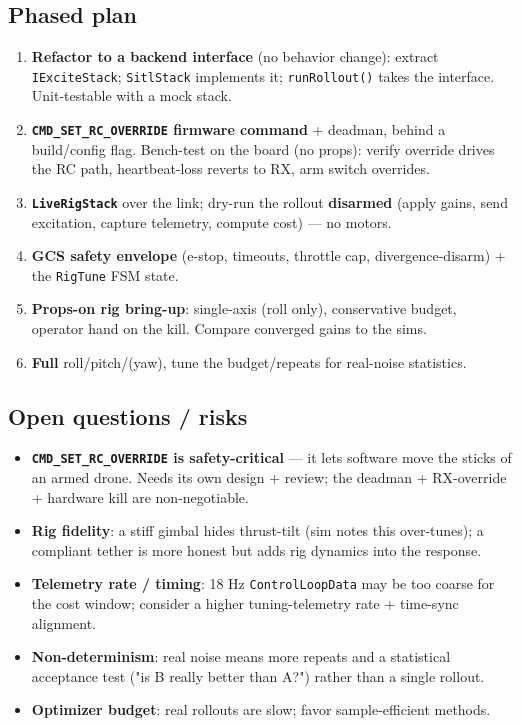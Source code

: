 \documentclass[
  11pt,
]{article}
\providecommand{\tightlist}{%
  \setlength{\itemsep}{0pt}\setlength{\parskip}{0pt}}
\begin{document}
\hypertarget{phased-plan}{%
\subsection{Phased plan}\label{phased-plan}}

\begin{enumerate}
\def\labelenumi{\arabic{enumi}.}
\tightlist
\item
  \textbf{Refactor to a backend interface} (no behavior change): extract
  \texttt{IExciteStack}; \texttt{SitlStack} implements it;
  \texttt{runRollout()} takes the interface. Unit-testable with a mock
  stack.
\item
  \textbf{\texttt{CMD\_SET\_RC\_OVERRIDE} firmware command} + deadman,
  behind a build/config flag. Bench-test on the board (no props): verify
  override drives the RC path, heartbeat-loss reverts to RX, arm switch
  overrides.
\item
  \textbf{\texttt{LiveRigStack}} over the link; dry-run the rollout
  \textbf{disarmed} (apply gains, send excitation, capture telemetry,
  compute cost) --- no motors.
\item
  \textbf{GCS safety envelope} (e-stop, timeouts, throttle cap,
  divergence-disarm) + the \texttt{RigTune} FSM state.
\item
  \textbf{Props-on rig bring-up}: single-axis (roll only), conservative
  budget, operator hand on the kill. Compare converged gains to the
  sim\textquotesingle s.
\item
  \textbf{Full} roll/pitch/(yaw), tune the budget/repeats for real-noise
  statistics.
\end{enumerate}

\hypertarget{open-questions--risks}{%
\subsection{Open questions / risks}\label{open-questions--risks}}

\begin{itemize}
\tightlist
\item
  \textbf{\texttt{CMD\_SET\_RC\_OVERRIDE} is safety-critical} --- it
  lets software move the sticks of an armed drone. Needs its own design
  + review; the deadman + RX-override + hardware kill are
  non-negotiable.
\item
  \textbf{Rig fidelity}: a stiff gimbal hides thrust-tilt (sim notes
  this over-tunes); a compliant tether is more honest but adds rig
  dynamics into the response.
\item
  \textbf{Telemetry rate / timing}: 18 Hz \texttt{ControlLoopData} may
  be too coarse for the cost window; consider a higher tuning-telemetry
  rate + time-sync alignment.
\item
  \textbf{Non-determinism}: real noise means more repeats and a
  statistical acceptance test ("is B really better than A?") rather than
  a single rollout.
\item
  \textbf{Optimizer budget}: real rollouts are slow; favor
  sample-efficient methods.
\end{itemize}
\end{document}
